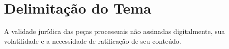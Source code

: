\chapter{Delimitação do Tema}
A validade jurídica das peças processuais não assinadas digitalmente, sua volatilidade e a necessidade de ratificação de seu conteúdo.
